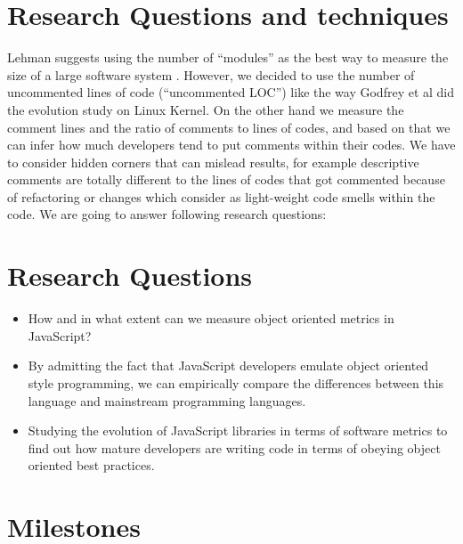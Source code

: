\documentclass[conference]{IEEEtran}
\begin{document}
	
	\section{Research Questions and techniques}
	Lehman suggests using the number of “modules” as the best way to measure the size of a large software system \cite{637156}. However, we decided to use the number of uncommented lines of code (“uncommented LOC”) like the way Godfrey et al \cite{883030} did the evolution study on Linux Kernel. On the other hand we measure the comment lines and the ratio of comments to lines of codes, and based on that we can infer how much developers tend to put comments within their codes. We have to consider hidden corners that can mislead results, for example descriptive comments are totally different to the lines of codes that got commented because of refactoring or changes which consider as light-weight code smells within the code.
	We are going to answer following research questions:
		\section{Research Questions}
		\begin{itemize}
			\item How and in what extent can we measure object oriented metrics in JavaScript?
			\item  By admitting the fact that JavaScript developers emulate object oriented style programming, we can empirically compare the differences between this language and mainstream programming languages.
			\item Studying the evolution of JavaScript libraries in terms of software metrics to find out how mature developers are writing code in terms of obeying object oriented best practices.
		\end{itemize}
	

	
	
	\label{sec:rq}
	
	\section{Milestones}
	
	
	
\end{document}
